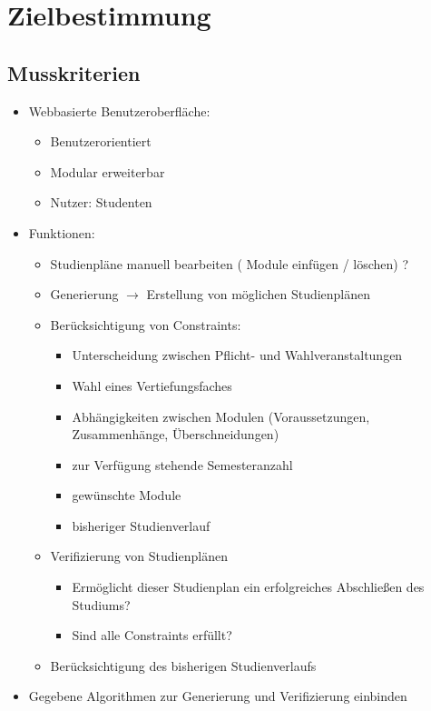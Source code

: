 \section{Zielbestimmung}

\subsection{Musskriterien}
\begin{itemize}[nosep]
	\item Webbasierte Benutzeroberfläche:
	\begin{itemize}[nosep]
		\item Benutzerorientiert 
		\item Modular erweiterbar
		\item Nutzer: Studenten
	\end{itemize}
	\item Funktionen:
	\begin{itemize}[nosep]
		\item Studienpläne manuell bearbeiten ( Module einfügen / löschen) ?
		\item Generierung $\rightarrow$ Erstellung von möglichen Studienplänen
		\item Berücksichtigung von Constraints:
		\begin{itemize}[nosep]
			\item Unterscheidung zwischen Pflicht- und Wahlveranstaltungen
			\item Wahl eines Vertiefungsfaches
			\item Abhängigkeiten zwischen Modulen (Voraussetzungen, Zusammenhänge, Überschneidungen)
			\item zur Verfügung stehende Semesteranzahl
			\item gewünschte Module
			\item bisheriger Studienverlauf
		\end{itemize}
		\item Verifizierung von Studienplänen
		\begin{itemize}[nosep]
			\item Ermöglicht dieser Studienplan ein erfolgreiches Abschließen des Studiums?
			\item Sind alle Constraints erfüllt?
		\end{itemize}
		\item Berücksichtigung des bisherigen Studienverlaufs
	\end{itemize}
	\item Gegebene Algorithmen zur Generierung und Verifizierung einbinden

\end{itemize}
